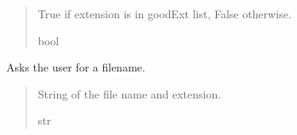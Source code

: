 \documentclass[letterpaper,10pt,english]{sphinxmanual}
\begin{document}
\begin{fulllineitems}
\begin{fulllineitems}
\begin{quote}
\begin{description}
\begin{itemize}
\end{itemize}

\sphinxAtStartPar
True if extension is in goodExt list, False otherwise.

\sphinxAtStartPar
bool

\end{description}\end{quote}

\end{fulllineitems}


\begin{fulllineitems}
\label{\detokenize{GetUserInput:GetUserInput.UserInput.GetFileName}}
\pysigstartsignatures
{}
\pysigstopsignatures
\sphinxAtStartPar
Asks the user for a filename.
\begin{quote}\begin{description}
\sphinxAtStartPar
String of the file name and extension.

\sphinxAtStartPar
str

\end{description}\end{quote}

\end{fulllineitems}



\end{fulllineitems}
\end{document}
